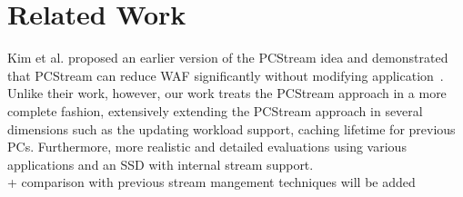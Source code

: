 \section{Related Work}
Kim et al. proposed an earlier version of the PCStream idea and 
demonstrated that PCStream can reduce WAF significantly without 
modifying application~\cite{PCStream}. 
Unlike their work, however, our work treats the PCStream approach
in a more complete fashion, extensively extending the PCStream approach
in several dimensions such as the updating workload support, caching
lifetime for previous PCs. Furthermore, more realistic and detailed 
evaluations using various applications and an SSD with internal 
stream support.
\\
+ comparison with previous stream mangement techniques will be added
